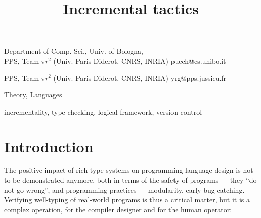 \documentclass[9pt]{sigplanconf}
\begin{document}
\copyrightdata{[to be supplied]}


\title{Incremental tactics}

           {Department of Comp. Sci., Univ. of Bologna,\\
             PPS, Team $\pi r^2$ (Univ. Paris Diderot, CNRS, INRIA)}
           {puech@cs.unibo.it}

           {PPS, Team $\pi r^2$ (Univ. Paris Diderot, CNRS, INRIA)}
           {yrg@pps.jussieu.fr}

\maketitle

\begin{abstract}
\end{abstract}

 

\terms
Theory, Languages

\keywords
incrementality, type checking, logical framework, version control


\section*{Introduction}


The positive impact of rich type systems on programming language
design is not to be demonstrated anymore, both in terms of the safety
of programs --- they ``do not go wrong'', and programming practices
--- modularity, early bug catching. Verifying well-typing of
real-world programs is thus a critical matter, but it is a complex
operation, for the compiler designer and for the human operator:
\end{document}
